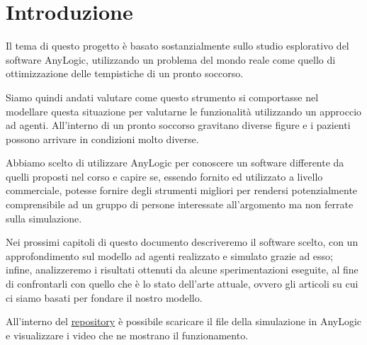 \chapter{Introduzione}

Il tema di questo progetto è basato sostanzialmente sullo studio esplorativo del software AnyLogic, utilizzando un problema del mondo reale come quello di ottimizzazione delle tempistiche di un pronto soccorso.

Siamo quindi andati valutare come questo strumento si comportasse nel modellare questa situazione per valutarne le funzionalità utilizzando un approccio ad agenti. 
All’interno di un pronto soccorso gravitano diverse figure e i pazienti possono arrivare in condizioni molto diverse.

Abbiamo scelto di utilizzare AnyLogic per conoscere un software differente da quelli proposti nel corso e capire se, essendo fornito ed utilizzato a livello commerciale, potesse fornire degli strumenti migliori per rendersi potenzialmente comprensibile ad un gruppo di persone interessate all’argomento ma non ferrate sulla simulazione.

Nei prossimi capitoli di questo documento descriveremo il software scelto, con un approfondimento sul modello ad agenti realizzato e simulato grazie ad esso; infine, analizzeremo i risultati ottenuti da alcune sperimentazioni eseguite, al fine di confrontarli con quello che è lo stato dell'arte attuale, ovvero gli articoli su cui ci siamo basati per fondare il nostro modello. 

All'interno del \href{https://github.com/NArmas-unimib/SC-EmergencyRoom/tree/main}{repository} è possibile scaricare il file della simulazione in AnyLogic e visualizzare i video che ne mostrano il funzionamento.